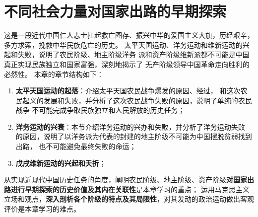 \documentclass[10pt, UTF8]{ctexbook} %
\begin{document}



\clearpage
\thispagestyle{empty}

\chapter{不同社会力量对国家出路的早期探索}
\thispagestyle{empty}

\setcounter{example}{0}
\setcounter{thm}{0}

\quad\quad 这是一段近代中国仁人志士扛起救亡图存、振兴中华的爱国主义大旗，历经艰辛，
多方求索，挽救中华民族危亡的历史。
太平天国运动、洋务运动和维新运动的兴起和失败，说明了农民阶级、地主阶级洋务
派和资产阶级维新派都不可能是中国真正实现民族独立和国家富强，深刻地揭示了
无产阶级领导中国革命走向胜利的必然性。
本章的章节结构如下：
\begin{enumerate}[label=2.\arabic*,itemsep=0pt]
    \item \textbf{太平天国运动的起落}：介绍太平天国农民战争爆发的原因、经过，
    和这次农民起义的发展和失败，并分析了这次农民战争失败的原因，说明了单纯的农民战争
    不可能完成争取民族独立和人民解放的历史任务；
    \item \textbf{洋务运动的兴衰}：本节介绍洋务运动的兴办和失败，并分析了洋务运动失败
    的原因，说明了以洋务派为代表的封建的地主阶级不可能为中国摆脱贫弱找到出路，
    也不可能避免最终失败的命运；
    \item \textbf{戊戌维新运动的兴起和夭折}；
\end{enumerate}

从实现近现代中国历史任务的角度，阐明农民阶级、地主阶级、资产阶级\textbf{对国家出路进行早期探索的历史价值及其内在关联性}是本章学习的重点；
运用马克思主义立场和观点，\textbf{深入剖析各个阶级的特点及其局限性}，对其发动的政治运动做出客观评价是本章学习的难点。
\end{document}
